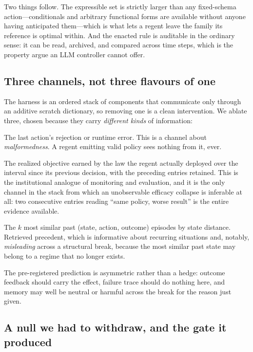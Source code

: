 \documentclass[11pt]{article}
\begin{document}
Two things follow. The expressible set is strictly larger than any fixed-schema action---conditionals
and arbitrary functional forms are available without anyone having anticipated them---which is what
lets a regent leave the family its reference is optimal within. And the enacted rule is auditable in
the ordinary sense: it can be read, archived, and compared across time steps, which is the property
\citet{zhong2026separating} argue an LLM controller cannot offer.

\subsection{Three channels, not three flavours of one}
\label{sec:channels}

The harness is an ordered stack of components that communicate only through an additive scratch
dictionary, so removing one is a clean intervention. We ablate three, chosen because they carry
\emph{different kinds} of information:

\begin{description}[leftmargin=0em,style=nextline]
\item[Failure trace] The last action's rejection or runtime error. This is a channel about
\emph{malformedness}. A regent emitting valid policy sees nothing from it, ever.
\item[Outcome feedback] The realized objective earned by the law the regent actually deployed over
the interval since its previous decision, with the preceding entries retained. This is the
institutional analogue of monitoring and evaluation, and it is the only channel in the stack from
which an unobservable efficacy collapse is inferable at all: two consecutive entries reading ``same
policy, worse result'' is the entire evidence available.
\item[Episodic memory] The $k$ most similar past (state, action, outcome) episodes by state
distance. Retrieved precedent, which is informative about recurring situations and, notably,
\emph{misleading} across a structural break, because the most similar past state may belong to a
regime that no longer exists.
\end{description}

The pre-registered prediction is asymmetric rather than a hedge: outcome feedback should carry the
effect, failure trace should do nothing here, and memory may well be neutral or harmful across the
break for the reason just given.

\subsection{A null we had to withdraw, and the gate it produced}
\label{sec:ctx-outcome}
\end{document}
